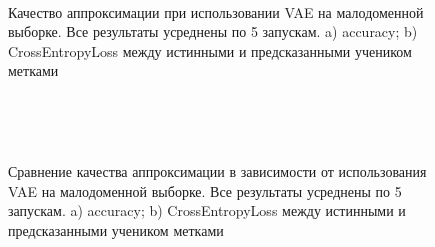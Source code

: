 \begin{figure}[h!t]\center
{}
\\
\caption{Качество аппроксимации при использовании VAE на малодоменной выборке. Все результаты усреднены по 5 запускам. a) accuracy; b) CrossEntropyLoss между истинными и предсказанными учеником метками}
\end{figure}\\

\begin{figure}[h!t]\center
{}
\\
\caption{Сравнение качества аппроксимации в зависимости от использования VAE на малодоменной выборке. Все результаты усреднены по 5 запускам. a) accuracy; b) CrossEntropyLoss между истинными и предсказанными учеником метками}
\end{figure}

